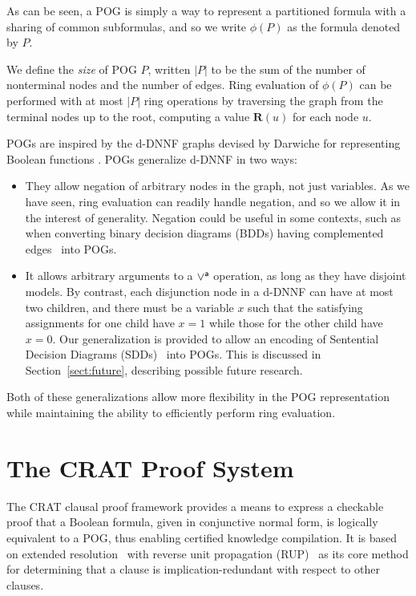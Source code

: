 \documentclass[letterpaper,USenglish,cleveref, autoref, thm-restate]{lipics-v2021}
\newcommand{\por}{\mathbin{\lor^{\sf a}}}
\newcommand{\rep}{\textbf{R}}
\begin{document}
As can be seen, a POG is simply a way to represent a partitioned
formula with a sharing of common subformulas, and so we write
$\phi(P)$ as the formula denoted by $P$.

We define the {\em size} of POG $P$, written $|P|$ to be the sum of
the number of nonterminal nodes and the number of edges.  Ring
evaluation of $\phi(P)$ can be performed with at most $|P|$ ring
operations by traversing the graph from the terminal nodes up to
the root, computing a value $\rep(u)$ for each node $u$.

POGs are inspired by the d-DNNF graphs devised by Darwiche for
representing Boolean functions \cite{darwiche:jair:2002}.
POGs generalize d-DNNF in two ways:
\begin{itemize}
\item They allow negation of arbitrary nodes in the graph, not just
  variables.  As we have seen, ring evaluation can readily handle negation, and so we allow it in the interest of generality.
  Negation could be useful in some contexts, such as when
  converting binary decision diagrams (BDDs) having complemented
  edges~\cite{brace-dac-1990,minato-dac-1990} into POGs.

\item It allows arbitrary arguments to a $\por$ operation, as long as
  they have disjoint models.  By contrast, each
  disjunction node in a d-DNNF can have at most two children, and there must be a variable $x$ such that
  the satisfying assignments for one child have $x=1$ while those for the
  other child have $x=0$.  Our generalization is provided to allow an
  encoding of Sentential Decision Diagrams (SDDs)~\cite{darwiche:ijcai:2011} into
  POGs.  This is discussed in Section~\ref{sect:future}, describing possible future research.
\end{itemize}
  Both of these generalizations allow more flexibility in the POG
  representation while maintaining the ability to efficiently perform ring evaluation.


\section{The CRAT Proof System}



The CRAT clausal proof framework provides a means to express a
checkable proof that a Boolean formula, given in conjunctive normal
form, is logically equivalent to a POG\@, thus enabling certified
knowledge compilation.  It is based on extended
resolution~\cite{Tseitin:1983} with reverse unit propagation
(RUP)~\cite{goldberg,vangelder08_verifying_rup_proofs} as its core method for
determining that a clause is implication-redundant with respect to other clauses.
\end{document}
